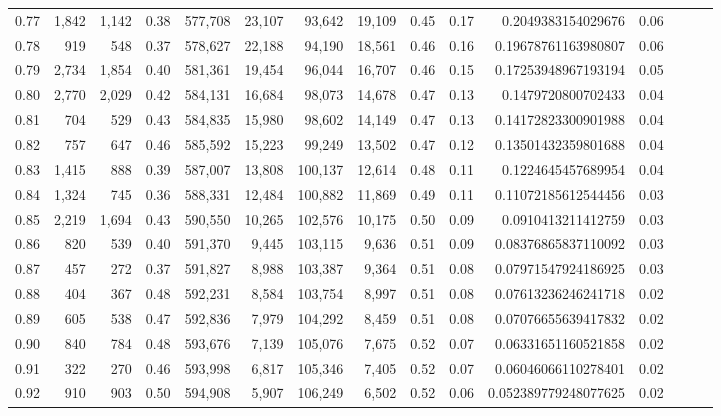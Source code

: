 \begin{tabular}{rrrrrrrrrrrrrrr}
0.77 &   1,842 &  1,142 &  0.38 &  577,708 &   23,107 &   93,642 &   19,109 &  0.45 &  0.17 &    0.2049383154029676 &      0.06 \\
0.78 &     919 &    548 &  0.37 &  578,627 &   22,188 &   94,190 &   18,561 &  0.46 &  0.16 &   0.19678761163980807 &      0.06 \\
0.79 &   2,734 &  1,854 &  0.40 &  581,361 &   19,454 &   96,044 &   16,707 &  0.46 &  0.15 &   0.17253948967193194 &      0.05 \\
0.80 &   2,770 &  2,029 &  0.42 &  584,131 &   16,684 &   98,073 &   14,678 &  0.47 &  0.13 &    0.1479720800702433 &      0.04 \\
0.81 &     704 &    529 &  0.43 &  584,835 &   15,980 &   98,602 &   14,149 &  0.47 &  0.13 &   0.14172823300901988 &      0.04 \\
0.82 &     757 &    647 &  0.46 &  585,592 &   15,223 &   99,249 &   13,502 &  0.47 &  0.12 &   0.13501432359801688 &      0.04 \\
0.83 &   1,415 &    888 &  0.39 &  587,007 &   13,808 &  100,137 &   12,614 &  0.48 &  0.11 &    0.1224645457689954 &      0.04 \\
0.84 &   1,324 &    745 &  0.36 &  588,331 &   12,484 &  100,882 &   11,869 &  0.49 &  0.11 &   0.11072185612544456 &      0.03 \\
0.85 &   2,219 &  1,694 &  0.43 &  590,550 &   10,265 &  102,576 &   10,175 &  0.50 &  0.09 &    0.0910413211412759 &      0.03 \\
0.86 &     820 &    539 &  0.40 &  591,370 &    9,445 &  103,115 &    9,636 &  0.51 &  0.09 &   0.08376865837110092 &      0.03 \\
0.87 &     457 &    272 &  0.37 &  591,827 &    8,988 &  103,387 &    9,364 &  0.51 &  0.08 &   0.07971547924186925 &      0.03 \\
0.88 &     404 &    367 &  0.48 &  592,231 &    8,584 &  103,754 &    8,997 &  0.51 &  0.08 &   0.07613236246241718 &      0.02 \\
0.89 &     605 &    538 &  0.47 &  592,836 &    7,979 &  104,292 &    8,459 &  0.51 &  0.08 &   0.07076655639417832 &      0.02 \\
0.90 &     840 &    784 &  0.48 &  593,676 &    7,139 &  105,076 &    7,675 &  0.52 &  0.07 &   0.06331651160521858 &      0.02 \\
0.91 &     322 &    270 &  0.46 &  593,998 &    6,817 &  105,346 &    7,405 &  0.52 &  0.07 &   0.06046066110278401 &      0.02 \\
0.92 &     910 &    903 &  0.50 &  594,908 &    5,907 &  106,249 &    6,502 &  0.52 &  0.06 &  0.052389779248077625 &      0.02 \\

\end{tabular}
